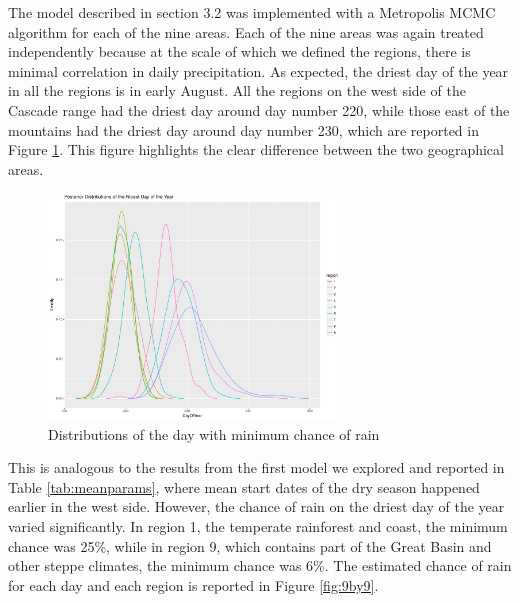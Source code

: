 \documentclass{article}
\begin{document}
The model described in section 3.2 was implemented with a Metropolis MCMC algorithm for each of the nine areas.  Each of the nine areas was again treated independently because at the scale of which we defined the regions, there is minimal correlation in daily precipitation.  As expected, the driest day of the year in all the regions is in early August. All the regions on the west side of the Cascade range had the driest day around day number 220, while those east of the mountains had the driest day around day number 230, which are reported in Figure \ref{fig:driestDist}. This figure highlights the clear difference between the two geographical areas.
\begin{figure}[H]
\centering
\includegraphics[width = .4\textwidth, height = 6cm]{NicestDayOfYear}
\caption{Distributions of the day with minimum chance of rain}
\label{fig:driestDist}
\end{figure}
This is analogous to the results from the first model we explored and reported in Table \ref{tab:meanparams}, where mean start dates of the dry season happened earlier in the west side.
However, the chance of rain on the driest day of the year varied significantly. In region 1, the temperate rainforest and coast, the minimum chance was 25\%, while in region 9, which contains part of the Great Basin and other steppe climates, the minimum chance was 6\%. The estimated chance of rain for each day and each region is reported in Figure \ref{fig:9by9}.
\end{document}
